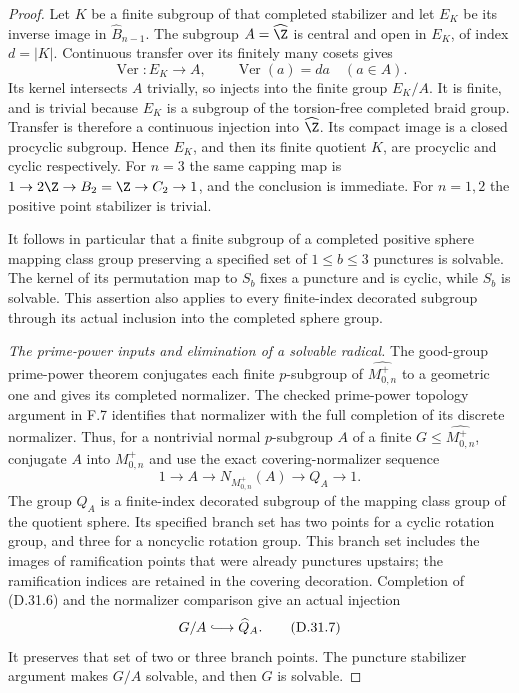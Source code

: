 \begin{proof}
Let $K$ be a finite subgroup of that completed stabilizer and let
$E_K$ be its inverse image in $\widehat B_{n-1}$. The subgroup
$A=\widehat\Z$ is central and open in $E_K$, of index $d=|K|$.
Continuous transfer over its finitely many cosets gives
\[
             \operatorname{Ver}:E_K\longrightarrow A,
             \qquad \operatorname{Ver}(a)=d a
             \quad(a\in A).                           \tag{D.31.5}
\]
Its kernel intersects $A$ trivially, so injects into the finite
group $E_K/A$. It is finite, and is trivial because $E_K$ is a
subgroup of the torsion-free completed braid group. Transfer is
therefore a continuous injection into $\widehat\Z$. Its compact
image is a closed procyclic subgroup. Hence $E_K$, and then its
finite quotient $K$, are procyclic and cyclic respectively.
For $n=3$ the same capping map is
$1\to2\Z\to B_2=\Z\to C_2\to1$, and the conclusion is immediate.
For $n=1,2$ the positive point stabilizer is trivial.

It follows in particular that a finite subgroup of a completed
positive sphere mapping class group preserving a specified set
of $1\leq b\leq3$ punctures is solvable. The kernel of its permutation
map to $S_b$ fixes a puncture and is cyclic, while $S_b$ is
solvable. This assertion also applies to every finite-index
decorated subgroup through its actual inclusion into the completed
sphere group.

\emph{The prime-power inputs and elimination of a solvable radical.}
The good-group prime-power theorem
\cite[Theorem~A]{R-BZ} conjugates each finite $p$-subgroup of
$\widehat{M_{0,n}^+}$ to a geometric one and gives its completed
normalizer. The checked prime-power topology argument in F.7
identifies that normalizer with the full completion of its
discrete normalizer. Thus, for a nontrivial normal $p$-subgroup
$A$ of a finite $G\leq\widehat{M_{0,n}^+}$, conjugate $A$ into
$M_{0,n}^+$ and use the exact covering-normalizer sequence
\[
 1\longrightarrow A\longrightarrow N_{M_{0,n}^+}(A)
       \longrightarrow Q_A\longrightarrow1.           \tag{D.31.6}
\]
The group $Q_A$ is a finite-index decorated subgroup of the
mapping class group of the quotient sphere. Its specified branch
set has two points for a cyclic rotation group, and three for a
noncyclic rotation group. This branch set includes the images of
ramification points that were already punctures upstairs; the
ramification indices are retained in the covering decoration.
Completion of (D.31.6) and the normalizer comparison give an
actual injection
\[
                 G/A\lhook\joinrel\longrightarrow\widehat Q_A.
                                                               \tag{D.31.7}
\]
It preserves that set of two or three branch points. The puncture
stabilizer argument makes $G/A$ solvable, and then $G$ is solvable.


\end{proof}
